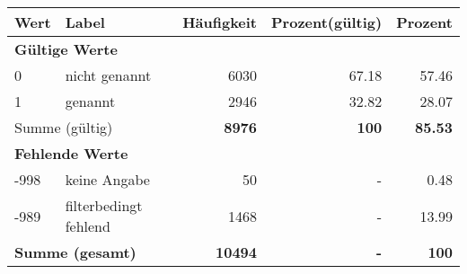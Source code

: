      \begin{longtable}{lXrrr}
     \toprule
     \textbf{Wert} & \textbf{Label} & \textbf{Häufigkeit} & \textbf{Prozent(gültig)} & \textbf{Prozent} \\
     \endhead
     \midrule
     \multicolumn{5}{l}{\textbf{Gültige Werte}}\\

     0 &
     \multicolumn{1}{X}{ nicht genannt   } &


       \num{6030} &
       \num[round-mode=places,round-precision=2]{67,18} &
         \num[round-mode=places,round-precision=2]{57,46} \\

     1 &
     \multicolumn{1}{X}{ genannt   } &


       \num{2946} &
       \num[round-mode=places,round-precision=2]{32,82} &
         \num[round-mode=places,round-precision=2]{28,07} \\
     \midrule
     \multicolumn{2}{l}{Summe (gültig)} &
       \textbf{\num{8976}} &
     \textbf{100} &
       \textbf{\num[round-mode=places,round-precision=2]{85,53}} \\
     \multicolumn{5}{l}{\textbf{Fehlende Werte}}\\
       -998 &
       keine Angabe &
         \num{50} &
        - &
         \num[round-mode=places,round-precision=2]{0,48} \\
       -989 &
       filterbedingt fehlend &
         \num{1468} &
        - &
         \num[round-mode=places,round-precision=2]{13,99} \\
     \midrule
     \multicolumn{2}{l}{\textbf{Summe (gesamt)}} &
          \textbf{\num{10494}} &
        \textbf{-} &
        \textbf{100} \\
     \bottomrule
     \end{longtable}
     
